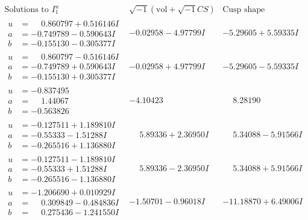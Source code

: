 \documentclass[1p]{elsarticle_modified}
\theoremstyle{definition}
\newcommand{\I}{\sqrt{-1}}
\begin{document}
$$\begin{array}{c|c|c}  
\text{Solutions to }I^u_{1}& \I (\text{vol} + \sqrt{-1}CS) & \text{Cusp shape}\\
 \hline 
\begin{aligned}
u &= \phantom{-}0.860797 + 0.516146 I \\
a &= -0.749789 - 0.590643 I \\
b &= -0.155130 - 0.305377 I\end{aligned}
 & -0.02958 - 4.97799 I & -5.29605 + 5.59335 I \\ \hline\begin{aligned}
u &= \phantom{-}0.860797 - 0.516146 I \\
a &= -0.749789 + 0.590643 I \\
b &= -0.155130 + 0.305377 I\end{aligned}
 & -0.02958 + 4.97799 I & -5.29605 - 5.59335 I \\ \hline\begin{aligned}
u &= -0.837495\phantom{ +0.000000I} \\
a &= \phantom{-}1.44067\phantom{ +0.000000I} \\
b &= -0.563826\phantom{ +0.000000I}\end{aligned}
 & -4.10423\phantom{ +0.000000I} & \phantom{-}8.28190\phantom{ +0.000000I} \\ \hline\begin{aligned}
u &= -0.127511 + 1.189810 I \\
a &= -0.55333 - 1.51288 I \\
b &= -0.265516 + 1.136880 I\end{aligned}
 & \phantom{-}5.89336 + 2.36950 I & \phantom{-}5.34088 - 5.91566 I \\ \hline\begin{aligned}
u &= -0.127511 - 1.189810 I \\
a &= -0.55333 + 1.51288 I \\
b &= -0.265516 - 1.136880 I\end{aligned}
 & \phantom{-}5.89336 - 2.36950 I & \phantom{-}5.34088 + 5.91566 I \\ \hline\begin{aligned}
u &= -1.206690 + 0.010929 I \\
a &= \phantom{-}0.309849 - 0.484836 I \\
b &= \phantom{-}0.275436 - 1.241550 I\end{aligned}
 & -1.50701 - 0.96018 I & -11.18870 + 6.49006 I \\ \hline\begin{aligned}

\end{aligned}
\end{array}$$
\end{document}
